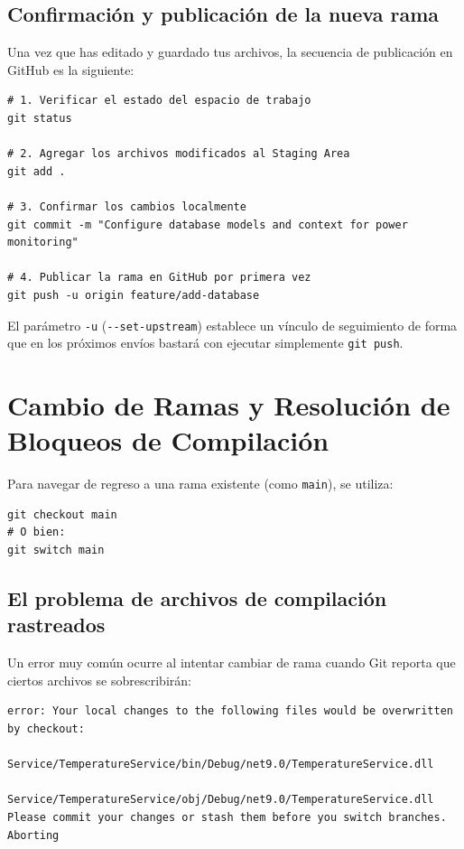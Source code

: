 \documentclass[
10pt, %
a4paper, %
oneside, %
headinclude,footinclude, %
BCOR5mm, %
]{scrartcl}
\begin{document}

\subsection{Confirmación y publicación de la nueva rama}
Una vez que has editado y guardado tus archivos, la secuencia de publicación en GitHub es la siguiente:

\begin{lstlisting}[language=DOS]
# 1. Verificar el estado del espacio de trabajo
git status

# 2. Agregar los archivos modificados al Staging Area
git add .

# 3. Confirmar los cambios localmente
git commit -m "Configure database models and context for power monitoring"

# 4. Publicar la rama en GitHub por primera vez
git push -u origin feature/add-database
\end{lstlisting}

El parámetro \texttt{-u} (\texttt{-{}-set-upstream}) establece un vínculo de seguimiento de forma que en los próximos envíos bastará con ejecutar simplemente \texttt{git push}.

\newpage
\section{Cambio de Ramas y Resolución de Bloqueos de Compilación}

Para navegar de regreso a una rama existente (como \texttt{main}), se utiliza:
\begin{lstlisting}[language=DOS]
git checkout main
# O bien:
git switch main
\end{lstlisting}

\subsection{El problema de archivos de compilación rastreados}
Un error muy común ocurre al intentar cambiar de rama cuando Git reporta que ciertos archivos se sobrescribirán:
\begin{lstlisting}[language=plaintext, style=miestiloclaro]
error: Your local changes to the following files would be overwritten by checkout:
        Service/TemperatureService/bin/Debug/net9.0/TemperatureService.dll
        Service/TemperatureService/obj/Debug/net9.0/TemperatureService.dll
Please commit your changes or stash them before you switch branches.
Aborting
\end{lstlisting}
\end{document}
